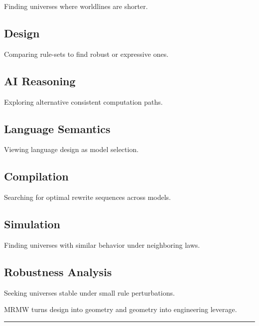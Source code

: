 Finding universes where worldlines are shorter.

\subsection{\texorpdfstring{\textbf{Design}}{Design}}\label{design-rmg}

Comparing rule-sets to find robust or expressive ones.

\subsection{\texorpdfstring{\textbf{AI
Reasoning}}{AI Reasoning}}\label{ai-reasoning}

Exploring alternative consistent computation paths.

\subsection{\texorpdfstring{\textbf{Language
Semantics}}{Language Semantics}}\label{language-semantics}

Viewing language design as model selection.

\subsection{\texorpdfstring{\textbf{Compilation}}{Compilation}}\label{compilation}

Searching for optimal rewrite sequences across models.

\subsection{\texorpdfstring{\textbf{Simulation}}{Simulation}}\label{simulation}

Finding universes with similar behavior under neighboring laws.

\subsection{\texorpdfstring{\textbf{Robustness
Analysis}}{Robustness Analysis}}\label{robustness-analysis}

Seeking universes stable under small rule perturbations.

MRMW turns design into geometry and geometry into engineering leverage.

\begin{center}\rule{0.5\linewidth}{0.5pt}\end{center}


